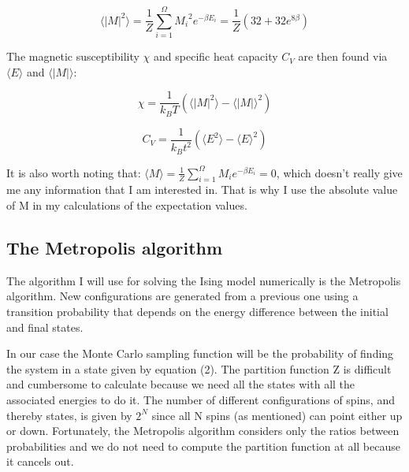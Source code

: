 \documentclass[twocolumn]{article}
\begin{document}
\begin{equation}
    \langle |M|^2 \rangle = \frac{1}{Z}\sum_{i=1}^{\Omega}{M_i}^2 e^{-\beta E_i} = \frac{1}{Z}( 32 + 32e^{8\beta} )
\end{equation}

The magnetic susceptibility $\chi$ and specific heat capacity $C_V$ are then found via $\langle E \rangle$ and $\langle |M| \rangle$:

\begin{equation}
    \chi = \frac{1}{k_B T}( \langle |M|^2 \rangle - {\langle |M| \rangle}^2 )
\end{equation}

\begin{equation}
    C_V = \frac{1}{k_B t^2}( \langle E^2 \rangle - {\langle E \rangle}^2 )
\end{equation}

It is also worth noting that:\newline
$\langle M \rangle = \frac{1}{Z}\sum_{i=1}^{\Omega}M_i e^{-\beta E_i} = 0$,
which doesn't really give me any information that I am interested in. That is why I use the absolute value of M in my calculations of the expectation values.

\subsection{The Metropolis algorithm}
The algorithm I will use for solving the Ising model numerically is the Metropolis algorithm. New configurations are generated from a previous one using a transition probability that depends on the energy difference between the initial and final states.\newline

In our case the Monte Carlo sampling function will be the probability of finding the system in a state given by equation (2). The partition function Z is difficult and cumbersome to calculate because we need all the states with all the associated energies to do it. The number of different configurations of spins, and thereby states, is given by $2^N$ since all N spins (as mentioned) can point either up or down. Fortunately, the Metropolis algorithm considers only the ratios between probabilities and we do not need to compute the partition function at all because it cancels out.\newline
\end{document}
